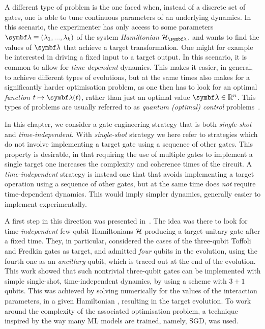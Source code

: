 A different type of problem is the one faced when, instead of a discrete set of gates, one is able to tune continuous parameters of an underlying dynamics.
In this scenario, the experimenter has only access to some parameters $\bslambda\equiv(\lambda_1,...,\lambda_k)$ of the system \textit{Hamiltonian} $\calH_{\bslambda}$, and wants to find the values of $\bslambda$ that achieve a target transformation.
One might for example be interested in driving a fixed input to a target output.
In this scenario, it is common to allow for \textit{time-dependent} dynamics. This makes it easier, in general, to achieve different types of evolutions, but at the same times also makes for a significantly harder optimisation problem, as one then has to look for an optimal \textit{function} $t\mapsto\bslambda(t)$, rather than just an optimal value $\bslambda\in\mathbb R^n$.
This types of problems are usually referred to as \textit{quantum (optimal) control} problems~\cite{dalessandro2007introduction,werschnik2007quantum,dong2010quantum}.

In this chapter, we consider a gate engineering strategy that is both \emph{single-shot} and \emph{time-independent}. With \emph{single-shot} strategy we here refer to strategies which do not involve implementing a target gate using a sequence of other gates. This property is desirable, in that requiring the use of multiple gates to implement a single target one increases the complexity and coherence times of the circuit.
A \emph{time-independent} strategy is instead one that that avoids implementing a target operation using a sequence of other gates, but at the same time does \emph{not} require time-dependent dynamics. This would imply simpler dynamics, generally easier to implement experimentally.

A first step in this direction was presented in~\cite{banchi2016quantum}.
The idea was there to look for time-\emph{independent} few-qubit Hamiltonians ${\mathcal{H}}$ producing a target unitary gate after a fixed time. They, in particular, considered the cases of the three-qubit Toffoli and Fredkin gates as target, and admitted \emph{four} qubits in the evolution, using the fourth one as an \emph{ancillary} qubit, which is traced out at the end of the evolution.
This work showed that such nontrivial three-qubit gates can be implemented with simple single-shot, time-independent dynamics, by using a scheme with $3+1$ qubits.
This was achieved by solving numerically for the values of the interaction parameters, in a given Hamiltonian \ansatz, resulting in the target evolution.
To work around the complexity of the associated optimisation problem, a technique inspired by the way many \ac{ML} models are trained, namely, \ac{SGD}, was used.

